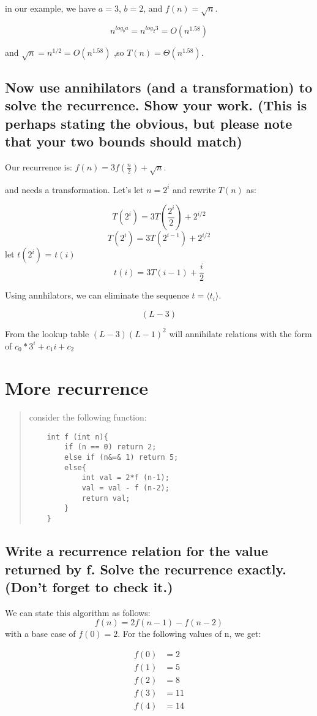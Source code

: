 \documentclass[titlepage]{article}\usepackage[]{graphicx}\usepackage[]{color}
\begin{document}
in our example, we have $a = 3$, $b = 2$, and $f(n) = \sqrt{n}$. 

\[ n^{log_b a} = n^{log_2 3} = O(n^{1.58}) \]

and $\sqrt{n} = n^{1/2} = O(n^{1.58})$ ,so $T(n) = \Theta(n^{1.58})$.

\subsection{Now use annihilators (and a transformation) to solve the recurrence. Show
your work. (This is perhaps stating the obvious, but please note that your two
bounds should match)}
Our recurrence is: $f(n) = 3f(\frac{n}{2}) + \sqrt{n}$. 


and needs a transformation. Let's  let $n = 2^i$ and rewrite $T(n)$ as:

\[ T(2^i) = 3T(\frac{2^i}{2}) + 2^{i/2} \]
\[ T(2^i) = 3T(2^{i-1}) + 2^{i/2} \]
let $t(2^i)$ = $t(i)$
\[ t(i) = 3T(i-1) + \frac{i}{2} \]

Using annhilators, we can eliminate the sequence $ t = \langle t_i \rangle $. 

\[ (L-3)   \]

From the lookup table $(L-3) (L-1)^2$ will annihilate relations with the form
of $c_0*3^i + c_1i + c_2$

\section{More recurrence}

\begin{quote}
consider the following function:
\begin{lstlisting}
	int f (int n){
		if (n == 0) return 2;
		else if (n&=& 1) return 5;
		else{
			int val = 2*f (n-1);
			val = val - f (n-2);
			return val;
		}
	}
\end{lstlisting}
\end{quote}

\subsection{Write a recurrence relation for the value returned by f. Solve the
recurrence exactly. (Don't forget to check it.)}
We can state this algorithm as follows:
\[ f(n) = 2f(n-1) - f(n-2) \]
with a base case of $f(0) = 2$. For the following values of n, we get:

\begin{align}
	f(0) &= 2 \\
	f(1) &= 5 \\
	f(2) &= 8 \\
	f(3) &= 11 \\
	f(4) &= 14
	\label{eqn:something}
\end{align}
\end{document}
